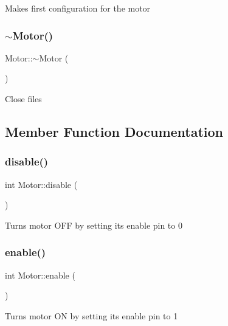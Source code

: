 Makes first configuration for the motor \mbox{\label{classMotor_a2e57c7b2681efea1d3b7f253ee88ecd4}} 
\subsubsection{\texorpdfstring{$\sim$\+Motor()}{~Motor()}}
{\footnotesize\ttfamily Motor\+::$\sim$\+Motor (\begin{DoxyParamCaption}{ }\end{DoxyParamCaption})\hspace{0.3cm}{\ttfamily [virtual]}}

Close files 

\subsection{Member Function Documentation}
\mbox{\label{classMotor_ac019bca262791cea21e1c84c9156d199}} 
\subsubsection{\texorpdfstring{disable()}{disable()}}
{\footnotesize\ttfamily int Motor\+::disable (\begin{DoxyParamCaption}{ }\end{DoxyParamCaption})}

Turns motor O\+FF by setting its enable pin to 0 \mbox{\label{classMotor_aff58309122a4ba7ea4d037e288c9192f}} 
\subsubsection{\texorpdfstring{enable()}{enable()}}
{\footnotesize\ttfamily int Motor\+::enable (\begin{DoxyParamCaption}{ }\end{DoxyParamCaption})}

Turns motor ON by setting its enable pin to 1 \mbox{\label{classMotor_a59b7b398bb2c52654a0b998643b3fbb8}} 
